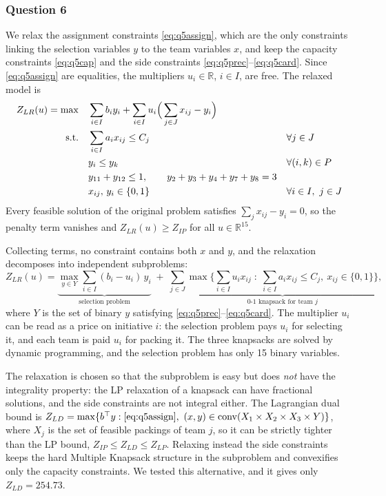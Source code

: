 \subsubsection*{Question 6}
We relax the assignment constraints \eqref{eq:q5assign}, which are the only
constraints linking the selection variables $y$ to the team variables $x$, and
keep the capacity constraints \eqref{eq:q5cap} and the side constraints
\eqref{eq:q5prec}--\eqref{eq:q5card}. Since \eqref{eq:q5assign} are
equalities, the multipliers $u_i \in \mathbb{R}$, $i \in I$, are free. The
relaxed model is
\begin{alignat}{2}
Z_{LR}(u) = \max \quad
& \sum_{i \in I} b_i y_i + \sum_{i \in I} u_i \Big(\sum_{j \in J} x_{ij} - y_i\Big) && \label{eq:q6obj}\\
\text{s.t.} \quad
& \sum_{i \in I} a_i x_{ij} \le C_j &&  \forall j \in J \notag\\
& y_i \le y_k &&  \forall (i,k) \in P \notag\\
& y_{11} + y_{12} \le 1, \qquad y_2 + y_3 + y_4 + y_7 + y_8 = 3 && \notag\\
& x_{ij},\, y_i \in \{0,1\} &&  \forall i \in I,\ j \in J \notag
\end{alignat}
Every feasible solution of the original problem satisfies
$\sum_j x_{ij} - y_i = 0$, so the penalty term vanishes and
$Z_{LR}(u) \ge Z_{IP}$ for all $u \in \mathbb{R}^{15}$.

Collecting terms, no constraint contains both $x$ and $y$, and the relaxation
decomposes into independent subproblems:
\[
Z_{LR}(u) =
\underbrace{\max_{y \in Y} \sum_{i \in I} (b_i - u_i)\, y_i}_{\text{selection problem}}
\; + \; \sum_{j \in J}
\underbrace{\max \Big\{ \sum_{i \in I} u_i x_{ij} \;:\; \sum_{i \in I} a_i x_{ij} \le C_j,\ x_{ij} \in \{0,1\} \Big\}}_{\text{0-1 knapsack for team } j},
\]
where $Y$ is the set of binary $y$ satisfying
\eqref{eq:q5prec}--\eqref{eq:q5card}. The multiplier $u_i$ can be read as a
price on initiative $i$: the selection problem pays $u_i$ for selecting it,
and each team is paid $u_i$ for packing it. The three knapsacks are solved by
dynamic programming, and the selection problem has only 15 binary variables.

The relaxation is chosen so that the subproblem is easy but does \emph{not}
have the integrality property: the LP relaxation of a knapsack can have
fractional solutions, and the side constraints are not integral either.
The Lagrangian dual bound is
$Z_{LD} = \max\{ b^\top y : \eqref{eq:q5assign},\ (x,y) \in \operatorname{conv}(X_1 \times X_2 \times X_3 \times Y) \}$,
where $X_j$ is the set of feasible packings of team $j$, so it can be strictly
tighter than the LP bound, $Z_{IP} \le Z_{LD} \le Z_{LP}$. Relaxing instead
the side constraints keeps the hard Multiple Knapsack structure in the
subproblem and convexifies only the capacity constraints. We tested this
alternative, and it gives only $Z_{LD} = 254.73$.


